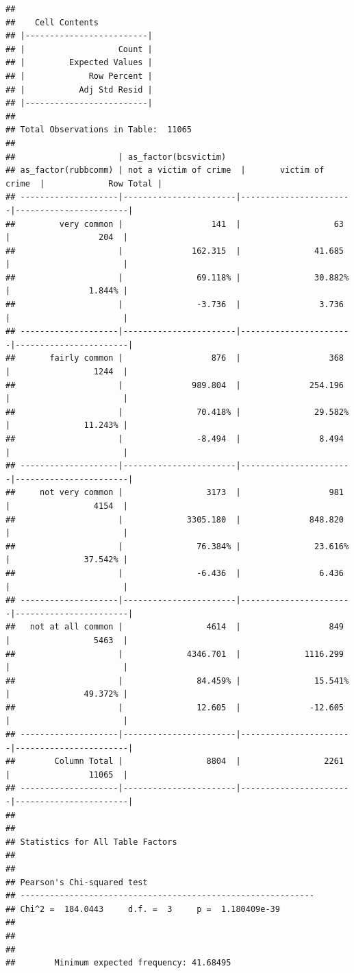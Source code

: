 \documentclass[
]{book}
\begin{document}
\begin{verbatim}
## 
##    Cell Contents
## |-------------------------|
## |                   Count |
## |         Expected Values |
## |             Row Percent |
## |           Adj Std Resid |
## |-------------------------|
## 
## Total Observations in Table:  11065 
## 
##                     | as_factor(bcsvictim) 
## as_factor(rubbcomm) | not a victim of crime  |       victim of crime  |             Row Total | 
## --------------------|-----------------------|-----------------------|-----------------------|
##         very common |                  141  |                   63  |                  204  | 
##                     |              162.315  |               41.685  |                       | 
##                     |               69.118% |               30.882% |                1.844% | 
##                     |               -3.736  |                3.736  |                       | 
## --------------------|-----------------------|-----------------------|-----------------------|
##       fairly common |                  876  |                  368  |                 1244  | 
##                     |              989.804  |              254.196  |                       | 
##                     |               70.418% |               29.582% |               11.243% | 
##                     |               -8.494  |                8.494  |                       | 
## --------------------|-----------------------|-----------------------|-----------------------|
##     not very common |                 3173  |                  981  |                 4154  | 
##                     |             3305.180  |              848.820  |                       | 
##                     |               76.384% |               23.616% |               37.542% | 
##                     |               -6.436  |                6.436  |                       | 
## --------------------|-----------------------|-----------------------|-----------------------|
##   not at all common |                 4614  |                  849  |                 5463  | 
##                     |             4346.701  |             1116.299  |                       | 
##                     |               84.459% |               15.541% |               49.372% | 
##                     |               12.605  |              -12.605  |                       | 
## --------------------|-----------------------|-----------------------|-----------------------|
##        Column Total |                 8804  |                 2261  |                11065  | 
## --------------------|-----------------------|-----------------------|-----------------------|
## 
##  
## Statistics for All Table Factors
## 
## 
## Pearson's Chi-squared test 
## ------------------------------------------------------------
## Chi^2 =  184.0443     d.f. =  3     p =  1.180409e-39 
## 
## 
##  
##        Minimum expected frequency: 41.68495
\end{verbatim}
\end{document}
